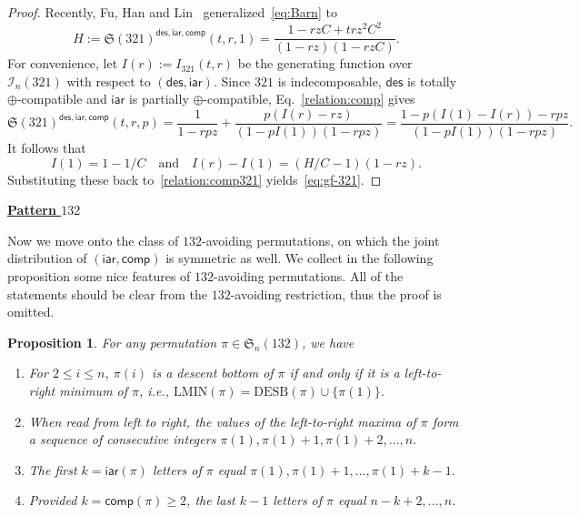 \documentclass[12pt]{amsart}
\numberwithin{equation}{section}
\theoremstyle{plain}
\newtheorem{proposition}[theorem]{Proposition}
\theoremstyle{definition}
\def\des{\mathsf{des}}
\def\S{\mathfrak{S}}
\def\iar{\mathsf{iar}}
\def\comp{\mathsf{comp}}
\def\LMIN{\mathrm{LMIN}}
\def\DESB{\mathrm{DESB}}
\newcommand{\In}{\mathcal{I}}
\def\DESB{\mathrm{DESB}}
\begin{document}
\begin{proof}
Recently, Fu, Han and Lin~\cite[Lemma 4.5]{FHL} generalized~\eqref{eq:Barn} to 
\begin{equation*}
H:=\S(321)^{\des,\iar,\comp}(t,r,1)=\frac{1-rzC+trz^2C^2}{(1-rz)(1-rzC)}.
\end{equation*}
For convenience, let $I(r):=I_{321}(t,r)$ be the generating function over $\In_n(321)$ with respect to $(\des,\iar)$. Since $321$ is indecomposable, $\des$ is totally $\oplus$-compatible and $\iar$ is partially  $\oplus$-compatible, Eq.~\eqref{relation:comp} gives 
\begin{equation}\label{relation:comp321}
\S(321)^{\des,\iar,\comp}(t,r,p)=\frac{1}{1-rpz}+\frac{p(I(r)-rz)}{(1-pI(1))(1-rpz)}=\frac{1-p(I(1)-I(r))-rpz}{(1-pI(1))(1-rpz)}.
\end{equation}
It follows that 
$$
I(1)=1-1/C\quad\text{and}\quad I(r)-I(1)=(H/C-1)(1-rz).
$$
Substituting these back to~\eqref{relation:comp321} yields~\eqref{eq:gf-321}. 
\end{proof}


\noindent \underline{\bf Pattern $132$}
\medskip

Now we move onto the class of $132$-avoiding permutations, on which the joint distribution of $(\iar,\comp)$ is symmetric as well. We collect in the following proposition some nice features of $132$-avoiding permutations. All of the statements should be clear from the $132$-avoiding restriction, thus the proof is omitted.
\begin{proposition}\label{prop:desbot=lmin}
For any permutation $\pi\in\S_n(132)$, we have
\begin{enumerate}
\item For $2\le i\le n$, $\pi(i)$ is a descent bottom of $\pi$ if and only if it is a left-to-right minimum of $\pi$, i.e., $\LMIN(\pi)=\DESB(\pi)\cup\{\pi(1)\}$.
\item When read from left to right, the values of the left-to-right maxima of $\pi$ form a sequence of consecutive integers $\pi(1),\pi(1)+1,\pi(1)+2,\ldots,n$. 
\item The first $k = \iar(\pi)$ letters of $\pi$ equal $\pi(1),\pi(1)+1,\ldots,\pi(1)+k-1.$
\item Provided $k = \comp(\pi) \ge 2$, the last $k-1$ letters of $\pi$ equal $n-k+2,\ldots,n$.
\end{enumerate}
\end{proposition}
\end{document}
